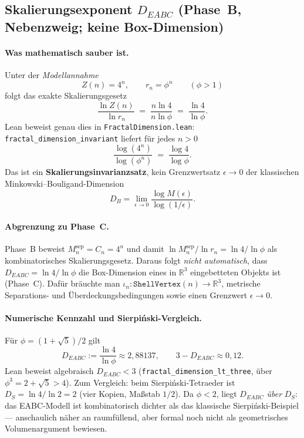 \documentclass[11pt,a4paper]{article}
\begin{document}
	\subsection{Skalierungsexponent $D_{EABC}$ (Phase~B, Nebenzweig; keine Box-Dimension)}
	\label{sec:fractal-dimension}
	
	\paragraph{Was mathematisch sauber ist.}
	Unter der \emph{Modellannahme}
	\[
	Z(n)=4^n,\qquad r_n=\phi^n\qquad(\phi>1)
	\]
	folgt das exakte Skalierungsgesetz
	\[
	\frac{\ln Z(n)}{\ln r_n}
	\;=\;
	\frac{n\ln 4}{n\ln\phi}
	\;=\;
	\frac{\ln 4}{\ln\phi}.
	\]
	Lean beweist genau dies in \texttt{FractalDimension.lean}:
	\texttt{fractal\_dimension\_invariant} liefert für jedes $n>0$
	\[
	\frac{\log(4^n)}{\log(\phi^n)}
	\;=\;
	\frac{\log 4}{\log\phi}.
	\]
	Das ist ein \textbf{Skalierungsinvarianzsatz}, kein Grenzwertsatz
	$\epsilon\to 0$ der klassischen Minkowski--Bouligand-Dimension
	\[
	D_B=\lim_{\epsilon\to0}\frac{\log M(\epsilon)}{\log(1/\epsilon)}.
	\]
	
	\paragraph{Abgrenzung zu Phase~C.}
	Phase~B beweist $M_n^{\mathrm{sep}}=C_n=4^n$ und damit
	$\ln M_n^{\mathrm{sep}}/\ln r_n=\ln4/\ln\phi$ als kombinatorisches
	Skalierungsgesetz.
	Daraus folgt \emph{nicht automatisch}, dass
	$D_{EABC}=\ln4/\ln\phi$ die Box-Dimension eines in $\mathbb{R}^3$
	eingebetteten Objekts ist (Phase~C).
	Dafür bräuchte man $\iota_n:\texttt{ShellVertex}(n)\to\mathbb{R}^3$,
	metrische Separations- und Überdeckungsbedingungen sowie einen Grenzwert
	$\epsilon\to 0$.
	
	\paragraph{Numerische Kennzahl und Sierpiński-Vergleich.}
	Für $\phi=(1+\sqrt5)/2$ gilt
	\[
	D_{EABC}:=\frac{\ln 4}{\ln\phi}\approx 2{,}88137,
	\qquad
	3-D_{EABC}\approx 0{,}12.
	\]
	Lean beweist algebraisch $D_{EABC}<3$ (\texttt{fractal\_dimension\_lt\_three},
	über $\phi^3=2+\sqrt5>4$).
	Zum Vergleich: beim Sierpiński-Tetraeder ist
	$D_S=\ln4/\ln2=2$ (vier Kopien, Maßstab $1/2$).
	Da $\phi<2$, liegt $D_{EABC}$ \emph{über} $D_S$: das EABC-Modell ist
	kombinatorisch dichter als das klassische Sierpiński-Beispiel --- anschaulich
	näher an raumfüllend, aber formal noch nicht als geometrisches Volumenargument
	bewiesen.
	
\end{document}
